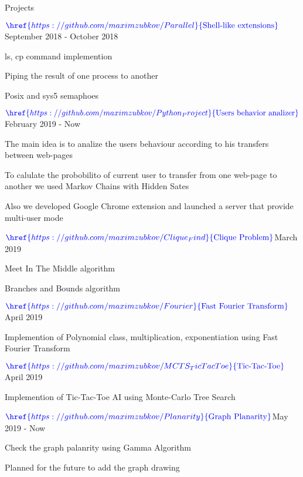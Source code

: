 \documentclass{resume} %
\begin{document}


\begin{rSection}{Projects}
\begin{rSubsection}{$\textcolor{blue}{\href{https://github.com/maximzubkov/Parallel}{\textnormal{Shell-like extensions}}}$}{September 2018 - October 2018}{}{}
\item ls, cp command implemention
\item Piping the result of one process to another
\item Posix and sys5 semaphoes
\end{rSubsection}

\begin{rSubsection}{$\textcolor{blue}{\href{https://github.com/maximzubkov/Python_Project}{\textnormal{Users behavior analizer}}}$}{February 2019 - Now}{}{}
\item The main idea is to analize the users behaviour according to his transfers between web-pages
\item To calulate the probobilito of current user to transfer from one web-page to another we used Markov Chains with Hidden Sates
\item Also we developed Google Chrome extension and launched a server that provide multi-user mode
\end{rSubsection}

\begin{rSubsection}{$\textcolor{blue}{\href{https://github.com/maximzubkov/Clique_Find}{\textnormal{Clique Problem}}}$}{March 2019}{}{}
\item Meet In The Middle algorithm
\item Branches and Bounds algorithm
\end{rSubsection}

\begin{rSubsection}{$\textcolor{blue}{\href{https://github.com/maximzubkov/Fourier}{\textnormal{Fast Fourier Transform}}}$}{April 2019}{}{}
\item Implemention of Polynomial class, multiplication, exponentiation using Fast Fourier Transform
\end{rSubsection}

\begin{rSubsection}{$\textcolor{blue}{\href{https://github.com/maximzubkov/MCTS_TicTacToe}{\textnormal{Tic-Tac-Toe}}}$}{April 2019}{}{}
\item Implemention of Tic-Tac-Toe AI using Monte-Carlo Tree Search
\end{rSubsection}

\begin{rSubsection}{$\textcolor{blue}{\href{https://github.com/maximzubkov/Planarity}{\textnormal{Graph Planarity}}}$}{May 2019 - Now}{}{}
\item Check the graph palanrity using Gamma Algorithm
\item Planned for the future to add the graph drawing
\end{rSubsection}

\end{rSection}
\end{document}
